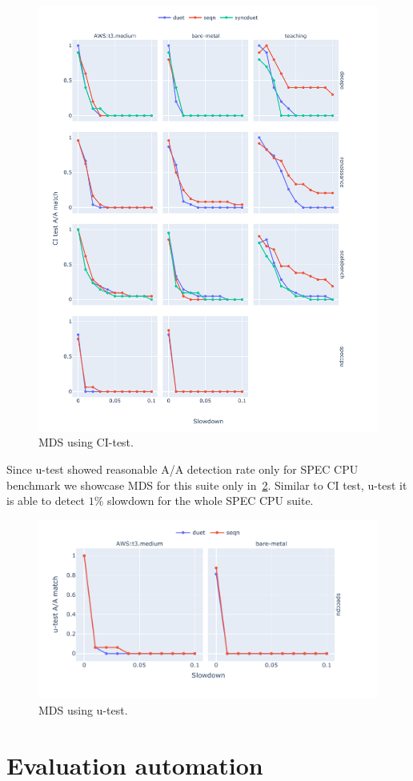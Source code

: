\begin{figure}
	\centering
	\includegraphics[width=1\linewidth]{./figures/mds_citest.pdf}
	\caption{
    MDS using CI-test.
	}
	\label{fig:mds_citest}
\end{figure}

Since \mbox{u-test} showed reasonable A/A detection rate only for SPEC CPU benchmark we showcase MDS for this suite only in~\cref{fig:mds_utest}.
Similar to CI test, \mbox{u-test} it is able to detect $1\%$ slowdown for the whole SPEC CPU suite.

\begin{figure}
	\centering
	\includegraphics[width=1\linewidth]{./figures/mds_utest.pdf}
	\caption{
    MDS using \mbox{u-test}.
	}
	\label{fig:mds_utest}
\end{figure}

\section{Evaluation automation}
\label{sec:automation}

